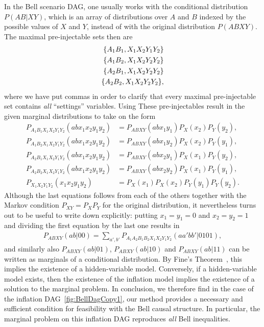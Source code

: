 {In the Bell scenario DAG, one usually works with the conditional distribution $P(AB|XY)$, which is an array of distributions over $A$ and $B$ indexed by the possible values of $X$ and $Y$, instead of with the original distribution $P(ABXY)$. The maximal pre-injectable sets then are
\begin{align*}
\brackets{A_1 B_1, X_1 X_2 Y_1 Y_2} \\
\brackets{A_1 B_2, X_1 X_2 Y_2 Y_2} \\
\brackets{A_2 B_1, X_1 X_2 Y_2 Y_2} \\
\brackets{A_2 B_2, X_1 X_2 Y_2 Y_2} ,
\end{align*}
where we have put commas in order to clarify that every maximal pre-injectable set contains \emph{all} ``settings'' variables. Using These pre-injectables result in the given marginal distributions to take on the form
\begin{align*}
	P_{A_1 B_1 X_1 X_2 Y_1 Y_2}(a b x_1 x_2 y_1 y_2) & = P_{A B X Y}(a b x_1 y_1) P_X(x_2) P_Y(y_2), \\
	P_{A_1 B_2 X_1 X_2 Y_1 Y_2}(a b x_1 x_2 y_1 y_2) & = P_{A B X Y}(a b x_1 y_2) P_X(x_2) P_Y(y_1), \\
	P_{A_2 B_1 X_1 X_2 Y_1 Y_2}(a b x_1 x_2 y_1 y_2) & = P_{A B X Y}(a b x_2 y_1) P_X(x_1) P_Y(y_2), \\
	P_{A_2 B_2 X_1 X_2 Y_1 Y_2}(a b x_1 x_2 y_1 y_2) & = P_{A B X Y}(a b x_2 y_2) P_X(x_1) P_Y(y_1), \\
		P_{X_1 X_2 Y_1 Y_2}(x_1 x_2 y_1 y_2) & = P_X(x_1) P_X(x_2) P_Y(y_1) P_Y(y_2).
\end{align*}
Although the last equations follows from each of the others together with the Markov condition $P_{XY} = P_X P_Y$ for the original distribution, it nevertheless turns out to be useful to write down explicitly: putting $x_1 = y_1 = 0$ and $x_2 = y_2 = 1$ and dividing the first equation by the last one results in
\begin{align*}
	P_{A B X Y}(a b | 0 0)  =  \sum_{a',b'} P_{A_1 A_2 B_1 B_2 X_1 X_2 Y_1 Y_2}(aa'bb'|0101),
\end{align*}
and similarly also $P_{A B X Y}(a b | 0 1)$, $P_{A B X Y}(a b | 1 0)$ and $P_{A B X Y}(a b | 1 1)$ can be written as marginals of a conditional distribution. By Fine's Theorem~\cite{FineTheorem}, this implies the existence of a hidden-variable model. Conversely, if a hidden-variable model exists, then the existence of the inflation model implies the existence of a solution to the marginal problem. In conclusion, we therefore find in the case of the inflation DAG~\cref{fig:BellDagCopy1}, our method provides a necessary and sufficient condition for feasibility with the Bell causal structure. In particular, the marginal problem on this inflation DAG reproduces \emph{all} Bell inequalities.

}
